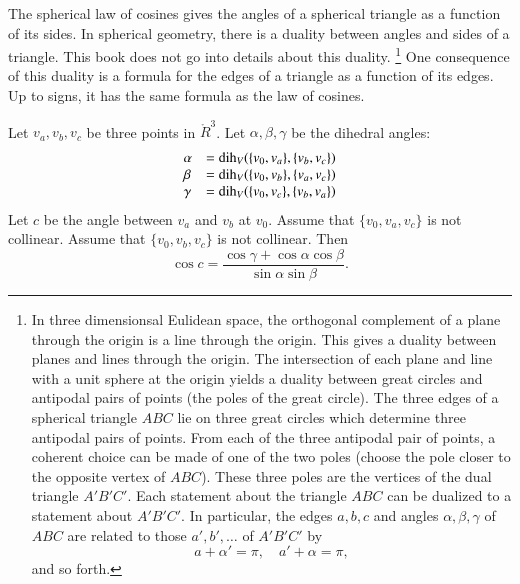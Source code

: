 The spherical law of cosines gives the angles of a spherical
triangle as a function of its sides.  In spherical geometry,
there is a duality between angles and sides of a triangle.
This book does not go into details about this duality.%
\footnote{In three dimensionsal Eulidean space, the orthogonal
complement of a plane through the origin is a line through
the origin.  This gives a duality between planes and lines
through the origin.  The intersection of each plane and line with
a unit sphere at the origin yields a duality between great
circles and antipodal
pairs of points (the poles of the great circle).  The three edges
of a spherical triangle $ABC$ lie on three great circles which
determine three
antipodal pairs of points.  From each of the three antipodal pair of points, 
a coherent
choice can be made of one of the two poles (choose the pole
closer to the opposite vertex of $ABC$).  
These three poles are the vertices
of the dual triangle $A'B'C'$.  Each statement about the triangle $ABC$
can be dualized to a statement about $A'B'C'$.
In particular, the edges $a,b,c$ and angles $\alpha,\beta,\gamma$ of $ABC$ 
are related to those $a',b',\ldots$ of $A'B'C'$ by
   $$
   a + \alpha' = \pi,\quad a' + \alpha= \pi,
   $$
and so forth.}  
One
consequence of this duality is a formula for the edges of
a triangle as a function of its edges.  Up to signs,
it has the same formula as the law of cosines.

\begin{lemma}
Let $v_a,v_b,v_c$ be three points in $\ring{R}^3$.
Let $\alpha,\beta,\gamma$ be the dihedral angles: 
   $$
   \begin{array}{lll}
     \alpha &= \operatorname{dih}_V(\{v_0,v_a\},\{v_b,v_c\})\\
     \beta &= \operatorname{dih}_V(\{v_0,v_b\},\{v_a,v_c\})\\
     \gamma&= \operatorname{dih}_V(\{v_0,v_c\},\{v_b,v_a\})\\
     \end{array}
   $$
Let $c$ be the
angle between $v_a$ and $v_b$ at $v_0$. 
Assume that $\{v_0,v_a,v_c\}$ is not
collinear. Assume that $\{v_0,v_b,v_c\}$ is not collinear.
Then
    $$
    \cos c = \frac{\cos \gamma + \cos \alpha \cos \beta}
     {\sin \alpha\sin \beta}.
    $$
\end{lemma}

